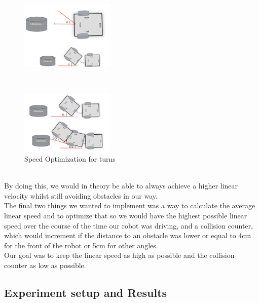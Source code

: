 \documentclass[conference]{IEEEtran}
\begin{document}
\begin{figure}[h] %
    \centering
    \includegraphics[width=0.4\textwidth]{betterNav1.png}
\end{figure}\\
\begin{figure}[h] %
    \centering
    \includegraphics[width=0.4\textwidth]{betterNav2.png}
    \caption{Speed Optimization for turns}
\end{figure} \\
By doing this, we would in theory be able to always achieve a higher linear velocity whilst still avoiding 
obstacles in our way.\\
The final two things we wanted to implement was a way to calculate the average linear speed and to optimize 
that so we would have the highest possible linear speed over the course of the time our robot was driving, 
and a collision counter, which would increment if the distance to an obstacle was lower or equal to 4cm for 
the front of the robot or 5cm for other angles.\\
Our goal was to keep the linear speed as high as possible and the collision counter as low as possible.


\subsection{Experiment setup and Results}
\end{document}

